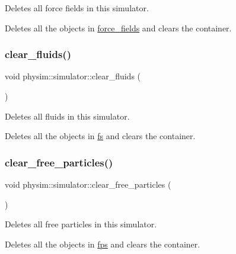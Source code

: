 Deletes all force fields in this simulator. 

Deletes all the objects in \hyperlink{classphysim_1_1simulator_a7e4d709f4b43199405be83eded074816}{force\+\_\+fields} and clears the container. \mbox{\label{classphysim_1_1simulator_adda92bb271d38830fa374d61a160afeb}} 
\subsubsection{\texorpdfstring{clear\+\_\+fluids()}{clear\_fluids()}}
{\footnotesize\ttfamily void physim\+::simulator\+::clear\+\_\+fluids (\begin{DoxyParamCaption}{ }\end{DoxyParamCaption})}



Deletes all fluids in this simulator. 

Deletes all the objects in \hyperlink{classphysim_1_1simulator_a34f5a69a58c9106cf42657c0700074e7}{fs} and clears the container. \mbox{\label{classphysim_1_1simulator_a3b6c748422ce495c2f26130136f6c460}} 
\subsubsection{\texorpdfstring{clear\+\_\+free\+\_\+particles()}{clear\_free\_particles()}}
{\footnotesize\ttfamily void physim\+::simulator\+::clear\+\_\+free\+\_\+particles (\begin{DoxyParamCaption}{ }\end{DoxyParamCaption})}



Deletes all free particles in this simulator. 

Deletes all the objects in \hyperlink{classphysim_1_1simulator_a4f92b1da1d5e8e0c35d6339991b4d7ce}{fps} and clears the container. \mbox{\label{classphysim_1_1simulator_a8112f43801df68b3140458d1915c8d97}} 
